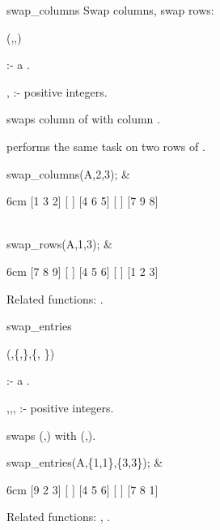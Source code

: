 \begin{Operator}{swap_columns}
Swap columns, swap rows:

\begin{Syntax}
 (,,)
\end{Syntax}

       :- a .

, :- positive integers. 
 
 swaps column  of  with 
column . 

 performs the same task on two rows of .

\begin{Examples}

swap_columns(A,2,3); &
\begin{multilineoutput}{6cm}
[1  3  2]
[       ]
[4  6  5]
[       ]
[7  9  8]
\end{multilineoutput}\\

swap_rows(A,1,3); &
\begin{multilineoutput}{6cm}
[7  8  9]
[       ]
[4  5  6]
[       ]
[1  2  3]
\end{multilineoutput}

\end{Examples}

Related functions: .

\end{Operator}


\begin{Operator}{swap_entries}

\begin{Syntax}
(,\{,\},\{,
\})
\end{Syntax}

  :- a . 

,,, :- positive integers.

 swaps (,) with 
(,).

\begin{Examples}

swap_entries(A,\{1,1\},\{3,3\}); &
\begin{multilineoutput}{6cm}
[9  2  3]
[       ]
[4  5  6]
[       ]
[7  8  1]
\end{multilineoutput}

\end{Examples}

Related functions: , .

\end{Operator}


